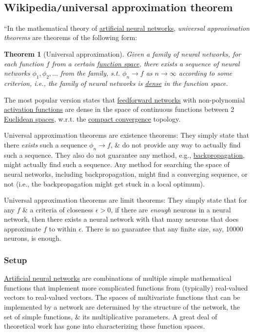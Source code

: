 \documentclass{article}
\newtheorem{theorem}{Theorem}
\begin{document}

\subsection{Wikipedia{\tt/}universal approximation theorem}
``In the mathematical theory of \href{https://en.wikipedia.org/wiki/Artificial_neural_networks}{artificial neural networks}, {\it universal approximation theorems} are theorems of the following form:

\begin{theorem}[Universal approximation]
	Given a family of neural networks, for each function $f$ from a certain \href{https://en.wikipedia.org/wiki/Function_space}{function space}, there exists a sequence of neural networks $\phi_1,\phi_2,\ldots$ from the family, s.t. $\phi_n\to f$ as $n\to\infty$ according to some criterion, i.e., the family of neural networks is \href{https://en.wikipedia.org/wiki/Dense_set}{dense} in the function space.
\end{theorem}
The most popular version states that \href{https://en.wikipedia.org/wiki/Feedforward_neural_network}{feedforward networks} with non-polynomial \href{https://en.wikipedia.org/wiki/Activation_function}{activation functions} are dense in the space of continuous functions between 2 \href{https://en.wikipedia.org/wiki/Euclidean_space}{Euclidean spaces}, w.r.t. the \href{https://en.wikipedia.org/wiki/Compact_convergence}{compact convergence} topology.

Universal approximation theorems are existence theorems: They simply state that there {\it exists} such a sequence $\phi_n\to f$, \& do not provide any way to actually find such a sequence. They also do not guarantee any method, e.g., \href{https://en.wikipedia.org/wiki/Backpropagation}{backpropagation}, might actually find such a sequence. Any method for searching the space of neural networks, including backpropagation, might find a converging sequence, or not (i.e., the backpropagation might get stuck in a local optimum).

Universal approximation theorems are limit theorems: They simply state that for any $f$ \& a criteria of closeness $\epsilon > 0$, if there are {\it enough} neurons in a neural network, then there exists a neural network with that many neurons that does approximate $f$ to within $\epsilon$. There is no guarantee that any finite size, say, 10000 neurons, is enough.

\subsubsection{Setup}
\href{https://en.wikipedia.org/wiki/Artificial_neural_networks}{Artificial neural networks} are combinations of multiple simple mathematical functions that implement more complicated functions from (typically) real-valued vectors to real-valued vectors. The spaces of multivariate functions that can be implemented by a network are determined by the structure of the network, the set of simple functions, \& its multiplicative parameters. A great deal of theoretical work has gone into characterizing these function spaces.
\end{document}
